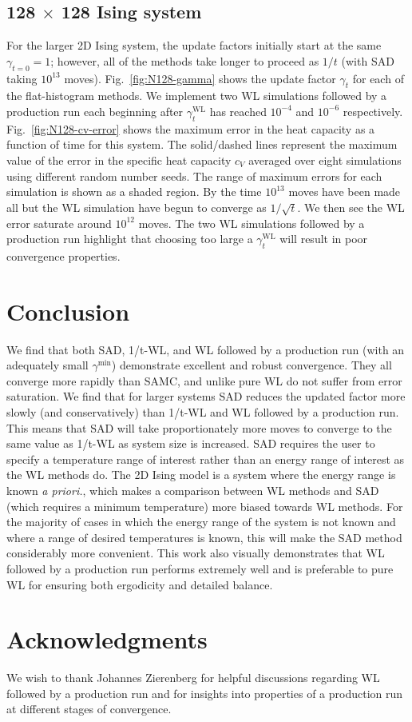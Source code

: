 \subsection{128 $\times$ 128 Ising system}
For the larger 2D Ising system, the update factors initially
start at the same $\gamma_{t=0} = 1$; however, all of the methods take longer
to proceed as $1/t$ (with SAD taking $10^{13}$ moves). Fig.~\ref{fig:N128-gamma} shows the update factor $\gamma_t$ for each of the 
flat-histogram methods. 
We implement two WL simulations followed by a production run each beginning
after $\gamma^{\text{WL}}_t$ has reached $10^{-4}$ and $10^{-6}$ respectively.
Fig.~\ref{fig:N128-cv-error} shows the maximum error in the heat capacity as a 
function of time for this system. The solid/dashed lines represent the maximum
value of the error in the specific heat capacity $c_V$ averaged
over eight simulations using different random number seeds. The range of maximum
errors for each simulation is shown as a shaded region. By
the time $10^{13}$ moves have been made all but the WL simulation have begun to
converge as $1/\sqrt{t}$. We then see the WL error saturate around $10^{12}$
moves. The two WL simulations followed by a production run highlight that
choosing too large a $\gamma^{\text{WL}}_t$ will result in poor convergence
properties.

\section{Conclusion}
We find that both SAD, 1/t-WL, and WL followed by a production run
(with an adequately small $\gamma^{\min}$) demonstrate excellent and robust
convergence. They all converge more rapidly than SAMC, and unlike pure WL do
not suffer from
error saturation. We find that for larger systems SAD reduces the updated factor
more slowly (and conservatively) than 1/t-WL and WL followed by a
production run. This means that SAD will take
proportionately more moves to converge to the same value as 1/t-WL as system
size is increased. SAD requires the user to specify a temperature range of
interest rather than an energy range of interest as the WL methods do. The 2D
Ising model is a system where the energy range is known \emph{a priori.}, which
makes a comparison between WL methods and SAD (which requires a minimum
temperature) more biased towards WL methods. For the majority of cases in which
the energy range of the system is not known and where a range of desired
temperatures is known, this will make the SAD method
considerably more convenient. This work also visually demonstrates
that WL followed by a production run performs extremely well and is preferable
to pure WL for ensuring both ergodicity and detailed balance.

\section{Acknowledgments}

We wish to thank Johannes Zierenberg for helpful discussions regarding WL followed by a production run and for insights into properties of a production run at different stages of convergence.